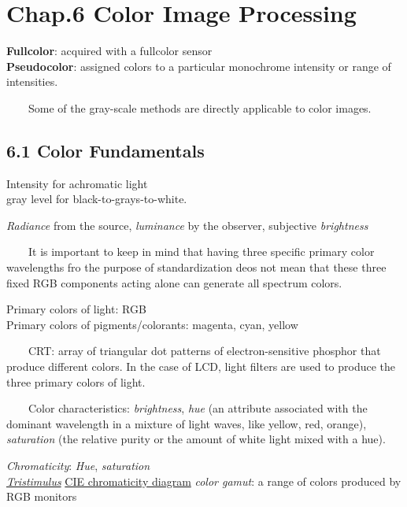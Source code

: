 \documentclass[]{article}
\date{}
\begin{document}
\section{Chap.6 Color Image Processing}\label{header-n0}

\textbf{Fullcolor}: acquired with a fullcolor sensor\\
 \textbf{Pseudocolor}: assigned colors to a particular monochrome
intensity or range of intensities.

\(\quad\quad\)Some of the gray-scale methods are directly applicable to
color images.

\subsection{6.1 Color Fundamentals}\label{header-n7}

Intensity for achromatic light\\
 gray level for black-to-grays-to-white.

\emph{Radiance} from the source, \emph{luminance} by the observer,
subjective \emph{brightness}

\(\quad\quad\)It is important to keep in mind that having three specific
primary color wavelengths fro the purpose of standardization deos not
mean that these three fixed RGB components acting alone can generate all
spectrum colors.

Primary colors of light: RGB\\
 Primary colors of pigments/colorants: magenta, cyan, yellow

\(\quad\quad\)CRT: array of triangular dot patterns of
electron-sensitive phosphor that produce different colors. In the case
of LCD, light filters are used to produce the three primary colors of
light.

\(\quad\quad\)Color characteristics: \emph{brightness}, \emph{hue} (an
attribute associated with the dominant wavelength in a mixture of light
waves, like yellow, red, orange), \emph{saturation} (the relative purity
or the amount of white light mixed with a hue).

\emph{Chromaticity}: \emph{Hue}, \emph{saturation}\\

\href{https://en.wikipedia.org/wiki/CIE_1931_color_space\#Tristimulus_values}{\emph{Tristimulus}}
\href{https://en.wikipedia.org/wiki/CIE_1931_color_space\#CIE_xy_chromaticity_diagram_and_the_CIE_xyY_color_space}{CIE
chromaticity diagram} \emph{color gamut}: a range of colors produced by
RGB monitors
\end{document}
